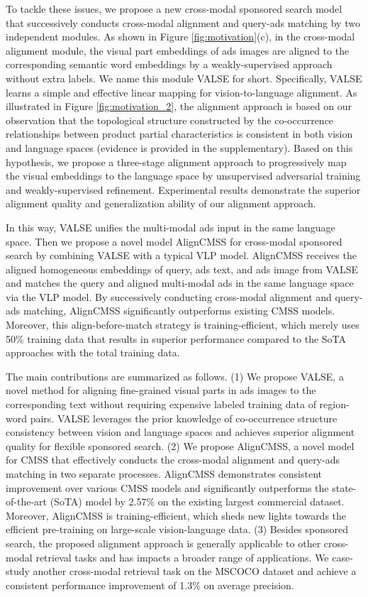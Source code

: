 \documentclass[letterpaper]{article} \usepackage{aaai24}  \usepackage{times}  \usepackage{helvet}  \usepackage{courier}  \usepackage[hyphens]{url}  \usepackage{graphicx} \urlstyle{rm} \def\UrlFont{\rm}  \usepackage{natbib}  \usepackage{caption} \frenchspacing  \setlength{\pdfpagewidth}{8.5in}  \setlength{\pdfpageheight}{11in}
\begin{document}
To tackle these issues, we propose a new cross-modal sponsored search model that successively conducts cross-modal alignment and query-ads matching by two independent modules. As shown in Figure \ref{fig:motivation}(c), in the cross-modal alignment module, the visual part embeddings of ads images are aligned to the corresponding semantic word embeddings by a weakly-supervised approach without extra labels. We name this module VALSE for short. Specifically, VALSE learns a simple and effective linear mapping for vision-to-language alignment. As illustrated in Figure \ref{fig:motivation_2}, the alignment approach is based on our observation that the topological structure constructed by the co-occurrence relationships between product partial characteristics is consistent in both vision and language spaces (evidence is provided in the supplementary). Based on this hypothesis, we propose a three-stage alignment approach to progressively map the visual embeddings to the language space by unsupervised adversarial training and weakly-supervised refinement. Experimental results demonstrate the superior alignment quality and generalization ability of our alignment approach. 

In this way, VALSE unifies the multi-modal ads input in the same language space. Then we propose a novel model AlignCMSS for cross-modal sponsored search by combining VALSE with a typical VLP model. AlignCMSS receives the aligned homogeneous embeddings of query, ads text, and ads image from VALSE and matches the query and aligned multi-modal ads in the same language space via the VLP model. By successively conducting cross-modal alignment and query-ads matching, AlignCMSS significantly outperforms existing CMSS models. Moreover, this align-before-match strategy is training-efficient, which  merely uses 50\% training data that results in superior performance compared to the SoTA approaches with the total training data. 

The main contributions are summarized as follows. (1)
We propose VALSE, a novel method for aligning fine-grained visual parts in ads images to the corresponding text without requiring expensive labeled training data of region-word pairs.
VALSE leverages the prior knowledge of co-occurrence structure consistency between vision and language spaces and achieves superior alignment quality for flexible sponsored search. 
(2) We propose AlignCMSS, a novel model for CMSS that effectively conducts the cross-modal alignment and query-ads matching in two separate processes. 
AlignCMSS  demonstrates consistent improvement over various CMSS models and significantly outperforms the state-of-the-art (SoTA) model by 2.57\% on the existing largest commercial dataset. Moreover, AlignCMSS is training-efficient, which sheds new
lights towards the efficient pre-training on large-scale vision-language data. 
(3) Besides sponsored search, the proposed alignment approach is generally applicable to other cross-modal retrieval tasks and has impacts a broader range of applications. We case-study another cross-modal retrieval task on the MSCOCO dataset and achieve a consistent performance improvement of 1.3\% on average precision.
\end{document}
